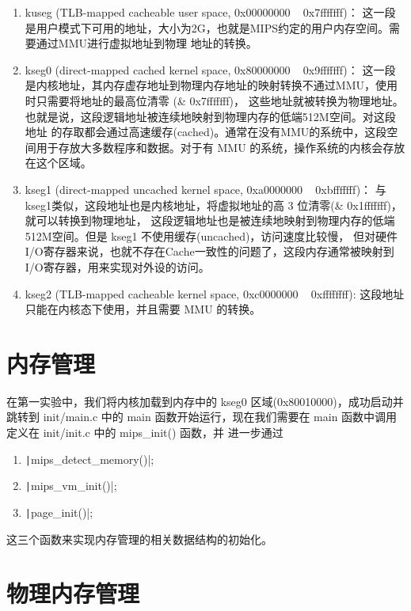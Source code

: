 \begin{enumerate}
  \item kuseg (TLB-mapped cacheable user space, 0x00000000 ~ 0x7fffffff)：
  这一段是用户模式下可用的地址，大小为2G，也就是MIPS约定的用户内存空间。需要通过MMU进行虚拟地址到物理
  地址的转换。
  \item kseg0 (direct-mapped cached kernel space, 0x80000000 ~ 0x9fffffff)：
  这一段是内核地址，其内存虚存地址到物理内存地址的映射转换不通过MMU，使用时只需要将地址的最高位清零
  (\& 0x7fffffff)，
  这些地址就被转换为物理地址。也就是说，这段逻辑地址被连续地映射到物理内存的低端512M空间。对这段地址
  的存取都会通过高速缓存(cached)。通常在没有MMU的系统中，这段空间用于存放大多数程序和数据。对于有
  MMU 的系统，操作系统的内核会存放在这个区域。
  \item kseg1 (direct-mapped uncached kernel space, 0xa0000000 ~ 0xbfffffff)：
  与kseg1类似，这段地址也是内核地址，将虚拟地址的高 3 位清零(\& 0x1fffffff)，就可以转换到物理地址，
  这段逻辑地址也是被连续地映射到物理内存的低端512M空间。但是 kseg1 不使用缓存(uncached)，访问速度比较慢，
  但对硬件I/O寄存器来说，也就不存在Cache一致性的问题了，这段内存通常被映射到I/O寄存器，用来实现对外设的访问。
  \item kseg2 (TLB-mapped cacheable kernel space, 0xc0000000 ~ 0xffffffff):
  这段地址只能在内核态下使用，并且需要 MMU 的转换。
\end{enumerate}

\section{内存管理}

在第一实验中，我们将内核加载到内存中的 kseg0 区域(0x80010000)，成功启动并跳转到 init/main.c 中的
 main 函数开始运行，现在我们需要在 main 函数中调用定义在 init/init.c 中的 mips\_init() 函数，并
进一步通过

\begin{enumerate}
  \item \texttt|mips_detect_memory()|;
  \item \texttt|mips_vm_init()|;
  \item \texttt|page_init()|;
\end{enumerate}

这三个函数来实现内存管理的相关数据结构的初始化。

\section{物理内存管理}


